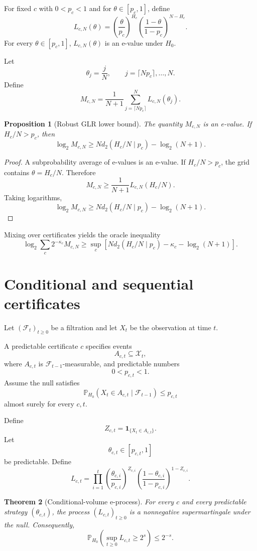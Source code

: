 \documentclass[11pt]{article}
\newtheorem{theorem}{Theorem}[section]
\newtheorem{proposition}[theorem]{Proposition}
\begin{document}
For fixed $c$ with $0<p_c<1$ and for $\theta\in[p_c,1]$, define
\[
L_{c,N}(\theta)
=
\left(\frac{\theta}{p_c}\right)^{H_c}
\left(\frac{1-\theta}{1-p_c}\right)^{N-H_c}.
\]
For every $\theta\in[p_c,1]$, $L_{c,N}(\theta)$ is an e-value under $H_0$.

Let
\[
\theta_j=\frac jN,
\qquad
j=\lceil Np_c\rceil,\dots,N.
\]
Define
\[
M_{c,N}
=
\frac1{N+1}
\sum_{j=\lceil Np_c\rceil}^{N}L_{c,N}(\theta_j).
\]

\begin{proposition}[Robust GLR lower bound]
The quantity $M_{c,N}$ is an e-value. If $H_c/N>p_c$, then
\[
\log_2M_{c,N}
\ge
N d_2(H_c/N\mid p_c)-\log_2(N+1).
\]
\end{proposition}

\begin{proof}
A subprobability average of e-values is an e-value. If $H_c/N>p_c$, the grid contains $\theta=H_c/N$. Therefore
\[
M_{c,N}\ge \frac1{N+1}L_{c,N}(H_c/N).
\]
Taking logarithms,
\[
\log_2M_{c,N}
\ge
Nd_2(H_c/N\mid p_c)-\log_2(N+1).
\]
\end{proof}

Mixing over certificates yields the oracle inequality
\[
\log_2\sum_c2^{-\kappa_c}M_{c,N}
\ge
\sup_c
\left[
Nd_2(H_c/N\mid p_c)-\kappa_c-\log_2(N+1)
\right].
\]

\section{Conditional and sequential certificates}

Let $(\mathcal F_t)_{t\ge0}$ be a filtration and let $X_t$ be the observation at time $t$.

A predictable certificate $c$ specifies events
\[
A_{c,t}\subseteq \mathcal X_t,
\]
where $A_{c,t}$ is $\mathcal F_{t-1}$-measurable, and predictable numbers
\[
0<p_{c,t}<1.
\]
Assume the null satisfies
\[
\mathbb P_{H_0}(X_t\in A_{c,t}\mid\mathcal F_{t-1})
\le p_{c,t}
\]
almost surely for every $c,t$.

Define
\[
Z_{c,t}=\mathbf 1_{\{X_t\in A_{c,t}\}}.
\]
Let
\[
\theta_{c,t}\in[p_{c,t},1]
\]
be predictable. Define
\[
L_{c,t}
=
\prod_{i=1}^{t}
\left(\frac{\theta_{c,i}}{p_{c,i}}\right)^{Z_{c,i}}
\left(\frac{1-\theta_{c,i}}{1-p_{c,i}}\right)^{1-Z_{c,i}}.
\]

\begin{theorem}[Conditional-volume e-process]
For every $c$ and every predictable strategy $(\theta_{c,t})$, the process $(L_{c,t})_{t\ge0}$ is a nonnegative supermartingale under the null.
Consequently,
\[
\mathbb P_{H_0}\left(\sup_{t\ge0}L_{c,t}\ge2^s\right)\le2^{-s}.
\]
\end{theorem}
\end{document}
